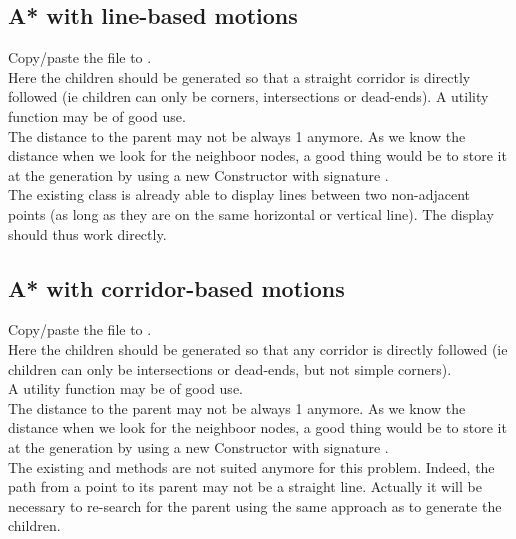 \documentclass{ecnreport}
\begin{document}
\subsection{A* with line-based motions}

Copy/paste the  file to .\\

Here the children should be generated so that a straight corridor is directly followed (ie children can only be corners, intersections or dead-ends).
A utility function  may be of good use.\\

The distance to the parent may not be always 1 anymore. As we know the distance when we look for the neighboor nodes, a good thing would be to store it 
at the generation by using a new Constructor with signature .\\

The existing  class is already able to display lines between two non-adjacent points (as long as they are on the same horizontal or
vertical line). The display should thus work directly.

\subsection{A* with corridor-based motions}

Copy/paste the  file to .\\

Here the children should be generated so that any corridor is directly followed (ie children can only be intersections or dead-ends, but
not simple corners).\\
A utility function  may be of good use.\\

The distance to the parent may not be always 1 anymore. As we know the distance when we look for the neighboor nodes, a good thing would be to store it 
at the generation by using a new Constructor with signature . \\

The existing  and  methods are not suited anymore for this problem. Indeed, the path from a point to its parent
may not be a straight line. Actually it will be necessary to re-search for the parent using the same approach as to generate the children.\\
\end{document}
